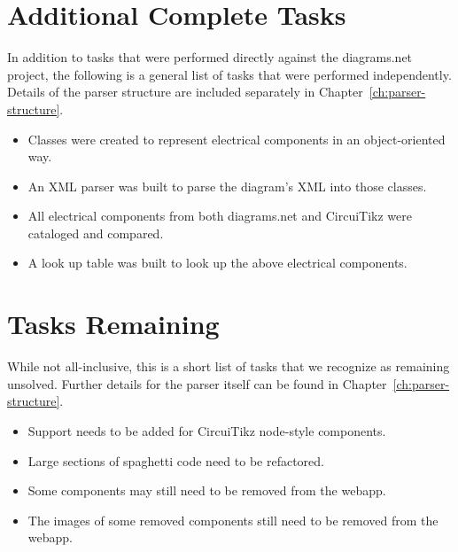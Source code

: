 \section{Additional Complete Tasks}\label{sec:additional-completed-tasks}
In addition to tasks that were performed directly against the diagrams.net project, the following is a general list of tasks that were performed independently.
Details of the parser structure are included separately in Chapter~\ref{ch:parser-structure}.
\begin{itemize}
 \item Classes were created to represent electrical components in an object-oriented way.
 \item An XML parser was built to parse the diagram's XML into those classes.
 \item All electrical components from both diagrams.net and CircuiTikz were cataloged and compared.
 \item A look up table was built to look up the above electrical components.
\end{itemize}

\section{Tasks Remaining}\label{sec:tasks-remaining}
While not all-inclusive, this is a short list of tasks that we recognize as remaining unsolved.
Further details for the parser itself can be found in Chapter~\ref{ch:parser-structure}.
\begin{itemize}
 \item Support needs to be added for CircuiTikz node-style components.
 \item Large sections of spaghetti code need to be refactored.
 \item Some components may still need to be removed from the webapp.
 \item The images of some removed components still need to be removed from the webapp.
\end{itemize}